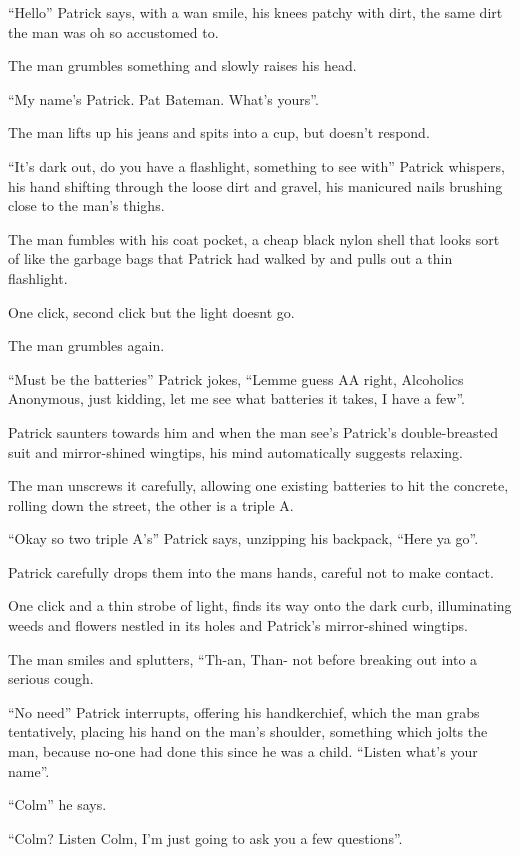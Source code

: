 \documentclass[19pt,openany]{book}
\begin{document}
``Hello'' Patrick says, with a wan smile, his knees patchy with dirt, the same
dirt the man was oh so accustomed to.

The man grumbles something and slowly raises his head.

``My name's Patrick. Pat Bateman. What's yours''.

The man lifts up his jeans and spits into a cup,  but doesn't respond.

``It's dark out, do you have a flashlight, something to see with'' Patrick whispers,
his hand shifting through the loose dirt and gravel, his manicured nails brushing close
to the man's thighs.

The man fumbles with his coat pocket, a cheap black nylon shell that looks sort of like the
garbage bags that Patrick had walked by and pulls out a thin flashlight.

One click, second click but the light doesnt go.

The man grumbles again.

``Must be the batteries'' Patrick jokes, ``Lemme guess AA right, Alcoholics Anonymous,
just kidding, let me see what batteries it takes, I have a few''.

Patrick saunters towards him and when the man see's Patrick's double-breasted
suit and mirror-shined wingtips, his mind automatically suggests relaxing.

The man unscrews it carefully, allowing one existing batteries to hit the concrete,
rolling down the street, the other is a triple A.

``Okay so two triple A's'' Patrick says, unzipping his backpack, ``Here ya go''.

Patrick carefully drops them into the mans hands, careful not to make contact.

One click and a thin strobe of light, finds its way onto the dark curb,
illuminating weeds and flowers nestled in its holes and Patrick's mirror-shined
wingtips.

The man smiles and splutters, ``Th-an, Than- not before breaking out
into a serious cough.

``No need'' Patrick interrupts, offering
his handkerchief, which the man grabs tentatively,
placing his hand on the man's shoulder, something
which jolts the man, because no-one had done this since he was a child. ``Listen what's your name''.

``Colm'' he says.

``Colm? Listen Colm, I'm just going to ask you a few questions''.
\end{document}
